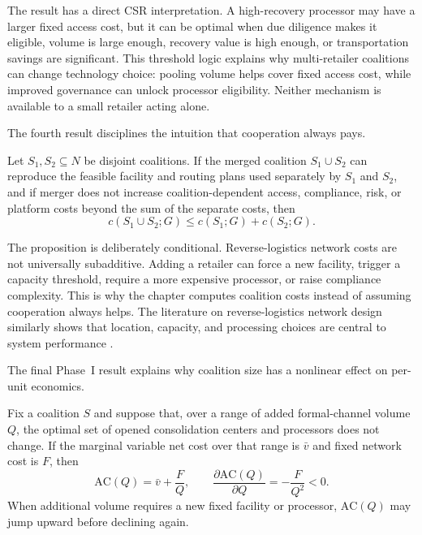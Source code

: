 The result has a direct CSR interpretation. A high-recovery processor may have a larger fixed access cost, but it can be optimal when due diligence makes it eligible, volume is large enough, recovery value is high enough, or transportation savings are significant. This threshold logic explains why multi-retailer coalitions can change technology choice: pooling volume helps cover fixed access cost, while improved governance can unlock processor eligibility. Neither mechanism is available to a small retailer acting alone.

The fourth result disciplines the intuition that cooperation always pays.

\begin{proposition}
\label{prop:ch4_subadditivity}
Let $S_1,S_2\subseteq N$ be disjoint coalitions. If the merged coalition $S_1\cup S_2$ can reproduce the feasible facility and routing plans used separately by $S_1$ and $S_2$, and if merger does not increase coalition-dependent access, compliance, risk, or platform costs beyond the sum of the separate costs, then
\begin{equation}
\label{eq:ch4_subadditivity}
c(S_1\cup S_2;G)\leq c(S_1;G)+c(S_2;G).
\end{equation}
\end{proposition}

The proposition is deliberately conditional. Reverse-logistics network costs are not universally subadditive. Adding a retailer can force a new facility, trigger a capacity threshold, require a more expensive processor, or raise compliance complexity. This is why the chapter computes coalition costs instead of assuming cooperation always helps. The literature on reverse-logistics network design similarly shows that location, capacity, and processing choices are central to system performance \cite{tadaros2022location,bafadal2024proposed,wang2025planning,ma2024unlocking,wang2025sustainable}.

The final Phase~I result explains why coalition size has a nonlinear effect on per-unit economics.

\begin{proposition}
\label{prop:ch4_average_cost_behavior}
Fix a coalition $S$ and suppose that, over a range of added formal-channel volume $Q$, the optimal set of opened consolidation centers and processors does not change. If the marginal variable net cost over that range is $\bar v$ and fixed network cost is $F$, then
\begin{equation}
\label{eq:ch4_average_cost_behavior}
\mathrm{AC}(Q)=\bar v+\frac{F}{Q},
\qquad
\frac{\partial \mathrm{AC}(Q)}{\partial Q}=-\frac{F}{Q^2}<0.
\end{equation}
When additional volume requires a new fixed facility or processor, $\mathrm{AC}(Q)$ may jump upward before declining again.
\end{proposition}


